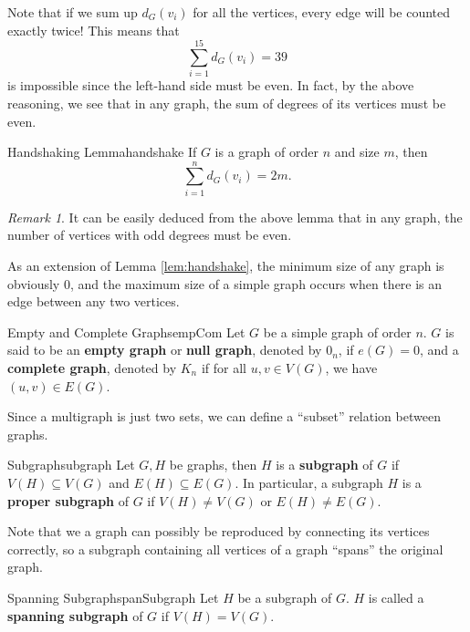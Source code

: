 \documentclass[math]{amznotes}
\theoremstyle{remark}
\newtheorem*{remark}{Remark}
\newcommand{\0}{\mathbf{0}}
\newcommand{\1}{\mathbf{1}}
\begin{document}
Note that if we sum up $d_G(v_i)$ for all the vertices, every edge will be counted exactly twice! This means that
\begin{equation*}
    \sum_{i = 1}^{15}d_G(v_i) = 39
\end{equation*}
is impossible since the left-hand side must be even. In fact, by the above reasoning, we see that in any graph, the sum of degrees of its vertices must be even.
\begin{lembox}{Handshaking Lemma}{handshake}
    If $G$ is a graph of order $n$ and size $m$, then
    \begin{equation*}
        \sum_{i = 1}^{n}d_G(v_i) = 2m.
    \end{equation*}
\end{lembox}
\begin{notebox}
    \begin{remark}
        It can be easily deduced from the above lemma that in any graph, the number of vertices with odd degrees must be even.
    \end{remark}
\end{notebox}
As an extension of Lemma \ref{lem:handshake}, the minimum size of any graph is obviously $0$, and the maximum size of a simple graph occurs when there is an edge between any two vertices.
\begin{dfnbox}{Empty and Complete Graphs}{empCom}
    Let $G$ be a simple graph of order $n$. $G$ is said to be an {\color{red} \textbf{empty graph}} or {\color{red} \textbf{null graph}}, denoted by $0_n$, if $e(G) = 0$, and a {\color{red} \textbf{complete graph}}, denoted by $K_n$ if for all $u, v \in V(G)$, we have $(u, v) \in E(G)$. 
\end{dfnbox}
Since a multigraph is just two sets, we can define a ``subset'' relation between graphs.
\begin{dfnbox}{Subgraph}{subgraph}
    Let $G, H$ be graphs, then $H$ is a {\color{red} \textbf{subgraph}} of $G$ if $V(H) \subseteq V(G)$ and $E(H) \subseteq E(G)$. In particular, a subgraph $H$ is a {\color{red} \textbf{proper subgraph}} of $G$ if $V(H) \neq V(G)$ or $E(H) \neq E(G)$.
\end{dfnbox}
Note that we a graph can possibly be reproduced by connecting its vertices correctly, so a subgraph containing all vertices of a graph ``spans'' the original graph.
\begin{dfnbox}{Spanning Subgraph}{spanSubgraph}
    Let $H$ be a subgraph of $G$. $H$ is called a {\color{red} \textbf{spanning subgraph}} of $G$ if $V(H) = V(G)$.
\end{dfnbox}
\end{document}
